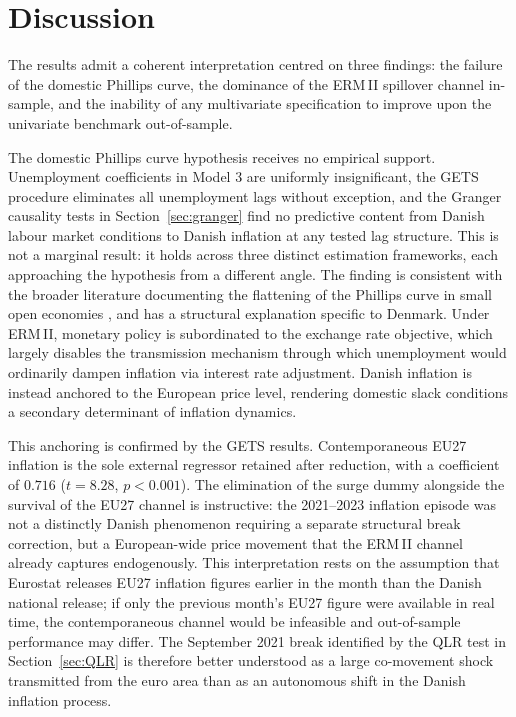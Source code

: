 
\section{Discussion}

The results admit a coherent interpretation centred on three findings: the failure of the domestic Phillips curve, the dominance of the ERM\,II spillover channel in-sample, and the inability of any multivariate specification to improve upon the univariate benchmark out-of-sample.

The domestic Phillips curve hypothesis receives no empirical support. Unemployment coefficients in Model 3 are uniformly insignificant, the GETS procedure eliminates all unemployment lags without exception, and the Granger causality tests in Section~\ref{sec:granger} find no predictive content from Danish labour market conditions to Danish inflation at any tested lag structure. This is not a marginal result: it holds across three distinct estimation frameworks, each approaching the hypothesis from a different angle. The finding is consistent with the broader literature documenting the flattening of the Phillips curve in small open economies \parencite{stock_watson_2008}, and has a structural explanation specific to Denmark. Under ERM\,II, monetary policy is subordinated to the exchange rate objective, which largely disables the transmission mechanism through which unemployment would ordinarily dampen inflation via interest rate adjustment. Danish inflation is instead anchored to the European price level, rendering domestic slack conditions a secondary determinant of inflation dynamics. 



This anchoring is confirmed by the GETS results. Contemporaneous EU27 inflation is the sole external regressor retained after reduction, with a coefficient of $0.716$ ($t = 8.28$, $p < 0.001$). The elimination of the surge dummy alongside the survival of the EU27 channel is instructive: the 2021--2023 inflation episode was not a distinctly Danish phenomenon requiring a separate structural break correction, but a European-wide price movement that the ERM\,II channel already captures endogenously. This interpretation rests on the assumption that Eurostat releases EU27 inflation figures earlier in the month than the Danish national release; if only the previous month's EU27 figure were available in real time, the contemporaneous channel would be infeasible and out-of-sample performance may differ. The September 2021 break identified by the QLR test in Section~\ref{sec:QLR} is therefore better understood as a large co-movement shock transmitted from the euro area than as an autonomous shift in the Danish inflation process.


